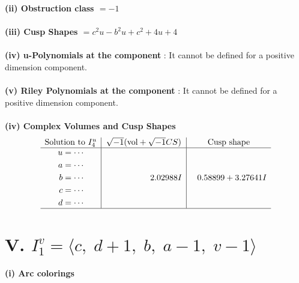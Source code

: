 \documentclass[1p]{elsarticle_modified}
\theoremstyle{definition}
\newcommand{\I}{\sqrt{-1}}
\begin{document}
\flushleft \textbf{(ii) Obstruction class $= -1$}\\~\\
\flushleft \textbf{(iii) Cusp Shapes $= c^2 u- b^2 u+c^2+4 u+4$}\\~\\
\flushleft \textbf{(iv) u-Polynomials at the component} : It cannot be defined for a positive dimension component.\\~\\
\flushleft \textbf{(v) Riley Polynomials at the component} : It cannot be defined for a positive dimension component.\\~\\
\newpage\flushleft \textbf{(iv) Complex Volumes and Cusp Shapes}
$$\begin{array}{c|c|c} 
\text{Solution to }I^u_{4}& \I (\text{vol} + \sqrt{-1}CS) & \text{Cusp shape}\\
 \hline 
\begin{aligned}
u &= \cdots \\
a &= \cdots \\
b &= \cdots \\
c &= \cdots \\
d &= \cdots\end{aligned}
 & \phantom{-0.000000 -}2.02988 I & \phantom{-}0.58899 + 3.27641 I\\
 \hline 
 \end{array}
$$\newpage\renewcommand{\arraystretch}{1}
\centering \section*{V. $I^v_{1}= \langle c,\;d+1,\;b,\;a-1,\;v-1 \rangle$}
\flushleft \textbf{(i) Arc colorings}\\
\end{document}

